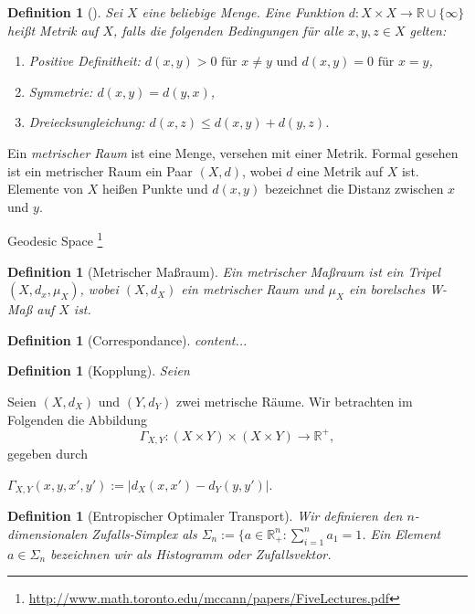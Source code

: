 \documentclass[11pt,a4paper]{article}
\def\emph#1{\textit{#1}}
\newtheorem{definition}[theorem]{Definition}
\numberwithin{equation}{section}
\begin{document}
	\begin{definition}[\cite{burago2001course}]
		Sei $X$ eine beliebige Menge. Eine Funktion $d:X \times X \to \mathbb{R} \cup \lbrace \infty \rbrace$ heißt \emph{Metrik} auf $X$, falls die folgenden Bedingungen für alle $x,y,z \in X$ gelten:
		\begin{enumerate}[label={(\arabic*)}]
			\item Positive Definitheit: $d(x,y) > 0 \text{ für } x \neq y \text{ und } d(x,y)=0 \text{ für } x=y$,
			\item Symmetrie: $d(x,y)=d(y,x)$,
			\item Dreiecksungleichung: $d(x,z) \leq d(x,y) + d(y,z)$.	
		\end{enumerate}
	\end{definition}
	Ein \emph{metrischer Raum} ist eine Menge, versehen mit einer Metrik. Formal gesehen ist ein metrischer Raum ein Paar $(X,d)$, wobei $d$ eine Metrik auf $X$ ist. Elemente von $X$ heißen Punkte und $d(x,y)$ bezeichnet die Distanz zwischen $x$ und $y$.
	
	
	
	

	Geodesic Space \footnote{\url{http://www.math.toronto.edu/mccann/papers/FiveLectures.pdf}}
	
	
	
	
	\begin{definition}[Metrischer Maßraum]
		Ein \emph{metrischer Maßraum} ist ein Tripel $(X,d_x,\mu_X)$, wobei $(X,d_X)$ ein metrischer Raum und $\mu_X$ ein borelsches W-Maß auf $X$ ist.
	\end{definition}
	
	\begin{definition}[Correspondance]
		content...
	\end{definition}
	
	\begin{definition}[Kopplung]
		Seien 
	\end{definition}
	
	Seien $(X,d_X)$ und $(Y,d_Y)$ zwei metrische Räume. Wir betrachten im Folgenden die Abbildung
	\begin{equation}
	\Gamma_{X,Y}: (X\times Y) \times (X \times Y) \to \mathbb{R^{+}},
	\end{equation}
	gegeben durch
	
	$\Gamma_{X,Y}(x,y,x',y'):= |d_X(x,x') - d_Y(y,y')|$.
	
	
	\begin{definition}[Entropischer Optimaler Transport]
		Wir definieren den $n$-dimensionalen Zufalls-Simplex als $\Sigma_n := \lbrace a \in \mathbb{R}_+^n: \sum_{i=1}^{n}{a_1} = 1$. Ein Element $a \in \Sigma_n$ bezeichnen wir als Histogramm oder Zufallsvektor.
		
	\end{definition}
	
\end{document}
